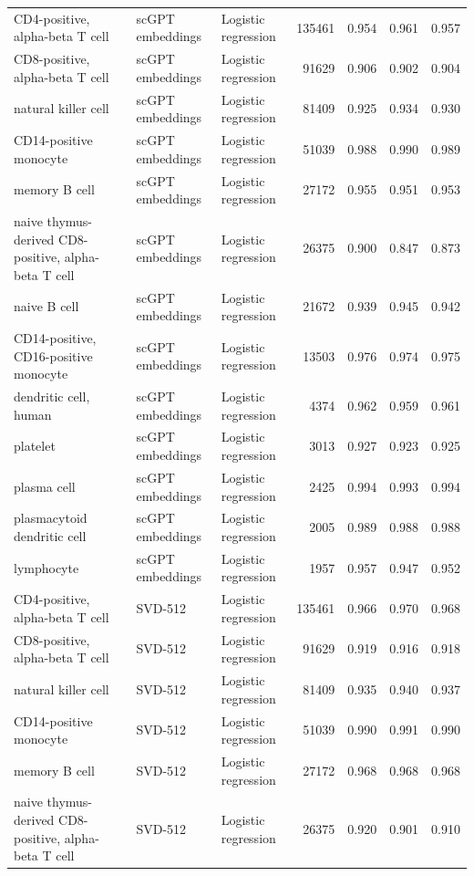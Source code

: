 {\begin{longtable}{>{\raggedright\arraybackslash}p{4.2cm}llrrrr}
CD4-positive, alpha-beta T cell & scGPT embeddings & Logistic regression & 135461 & 0.954 & 0.961 & 0.957 \\
CD8-positive, alpha-beta T cell & scGPT embeddings & Logistic regression & 91629 & 0.906 & 0.902 & 0.904 \\
natural killer cell & scGPT embeddings & Logistic regression & 81409 & 0.925 & 0.934 & 0.930 \\
CD14-positive monocyte & scGPT embeddings & Logistic regression & 51039 & 0.988 & 0.990 & 0.989 \\
memory B cell & scGPT embeddings & Logistic regression & 27172 & 0.955 & 0.951 & 0.953 \\
naive thymus-derived CD8-positive, alpha-beta T cell & scGPT embeddings & Logistic regression & 26375 & 0.900 & 0.847 & 0.873 \\
naive B cell & scGPT embeddings & Logistic regression & 21672 & 0.939 & 0.945 & 0.942 \\
CD14-positive, CD16-positive monocyte & scGPT embeddings & Logistic regression & 13503 & 0.976 & 0.974 & 0.975 \\
dendritic cell, human & scGPT embeddings & Logistic regression & 4374 & 0.962 & 0.959 & 0.961 \\
platelet & scGPT embeddings & Logistic regression & 3013 & 0.927 & 0.923 & 0.925 \\
plasma cell & scGPT embeddings & Logistic regression & 2425 & 0.994 & 0.993 & 0.994 \\
plasmacytoid dendritic cell & scGPT embeddings & Logistic regression & 2005 & 0.989 & 0.988 & 0.988 \\
lymphocyte & scGPT embeddings & Logistic regression & 1957 & 0.957 & 0.947 & 0.952 \\
CD4-positive, alpha-beta T cell & SVD-512 & Logistic regression & 135461 & 0.966 & 0.970 & 0.968 \\
CD8-positive, alpha-beta T cell & SVD-512 & Logistic regression & 91629 & 0.919 & 0.916 & 0.918 \\
natural killer cell & SVD-512 & Logistic regression & 81409 & 0.935 & 0.940 & 0.937 \\
CD14-positive monocyte & SVD-512 & Logistic regression & 51039 & 0.990 & 0.991 & 0.990 \\
memory B cell & SVD-512 & Logistic regression & 27172 & 0.968 & 0.968 & 0.968 \\
naive thymus-derived CD8-positive, alpha-beta T cell & SVD-512 & Logistic regression & 26375 & 0.920 & 0.901 & 0.910 \\

\end{longtable}}
